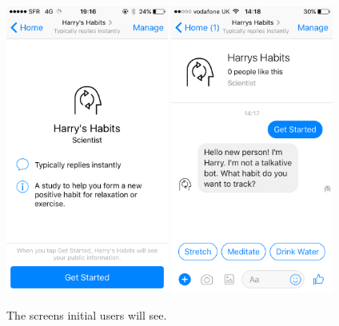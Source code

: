 \begin{figure}[H]
  \centering
  \includegraphics[width=2.1in]{../resources/design/media/1.png}
  \hspace{10px}
  \includegraphics[width=2.1in]{../resources/design/media/2.png}
  \caption{The screens initial users will see.}
  \label{fig:setup_media_1}
\end{figure}

